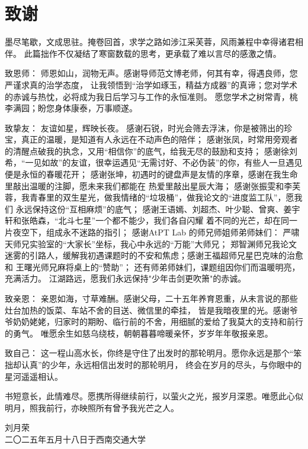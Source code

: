 \chapter*{致\quad 谢}
墨尽笔歇，文成思驻。掩卷回首，求学之路如涉江采芙蓉，风雨兼程中幸得诸君相伴。
此篇拙作不仅凝结了寒窗数载的思考，更承载了难以言尽的感激之情。

致恩师：
师恩如山，润物无声。感谢导师范文博老师，何其有幸，得遇良师，您严谨求真的治学态度，
让我领悟到“治学如琢玉，精益方成器”的真谛；您对学术的赤诚与热忱，必将成为我日后学习与工作的永恒准则。
愿您学术之树常青，桃李满园；盼您身体康泰，万事顺遂。

致挚友：
友谊如星，辉映长夜。
感谢石锐，时光会筛去浮沫，你是被筛出的珍宝，真正的温暖，是知道有人永远在不动声色的陪伴；
感谢张凤，时常用旁观者的清醒点破我的执念，又用“相信你”的底气，给我无尽的鼓励和支持；
感谢徐刘希，“一见如故”的友谊，很幸运遇见“无需讨好、不必伪装”的你，有些人一旦遇见便是永恒的春暖花开；
感谢张坤，初遇时的键盘声是友情的序章，感谢在我生命里敲出温暖的注脚，愿未来我们都能在
热爱里敲出星辰大海；
感谢张振雯和李芙蓉，我青春里的双生星光，做我情绪的“垃圾桶”，做我论文的“进度监工队”，愿我们
永远保持这份“互相麻烦”的底气；
感谢王语嫣、刘超杰、叶少聪、曾爽、姜宇轩和张皓森，“北斗七星”一个都不能少，我们各自闪耀
着不同的光芒，却在同一片夜空下，组成永不迷路的指引；
感谢AtPT Lab 的师兄师姐师弟师妹们：
严啸天师兄实验室的“大家长”坐标，我心中永远的“万能”大师兄；
郑智渊师兄我论文迷雾的引路人，缓解我初遇课题时的不安和焦虑；感谢王福超师兄星巴克味的治愈和
王曙光师兄麻将桌上的“赞助”；
还有师弟师妹们，课题组因你们而温暖明亮，充满活力。
江湖路远，愿我们永远保持"少年击剑更吹箫"的赤诚。 

致亲恩：
亲恩如海，寸草难酬。感谢父母，二十五年养育恩重，从未言说的那些灶台加热的饭菜、车站不舍的目送、微信里的牵挂，
皆是我暗夜里的光。感谢爷爷奶奶姥姥，归家时的期盼、临行前的不舍，用细腻的爱给了我莫大的支持和前行的勇气。
唯愿余生如慈乌绕枝，朝朝暮暮啼暖亲怀，岁岁年年敬报亲恩。

致自己：
这一程山高水长，你终是守住了出发时的那轮明月。愿你永远是那个“笨拙却认真”的少年，永远相信出发时的那轮明月，
终会在岁月的尽头，与你眼中的星河遥遥相认。

书短意长，此情难尽。愿携所得继续前行，以萤火之光，报岁月深恩。唯愿此心似明月，照我前行，亦映照所有曾予我光芒之人。


\begin{flushright}
刘月荣\\
二〇二五年五月十八日于西南交通大学
\end{flushright}
